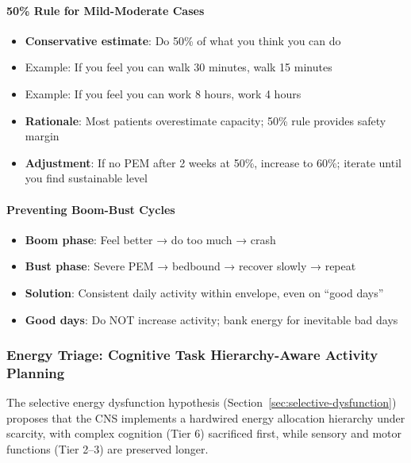 \paragraph{50\% Rule for Mild-Moderate Cases}

\begin{itemize}
    \item \textbf{Conservative estimate}: Do 50\% of what you think you can do
    \item Example: If you feel you can walk 30 minutes, walk 15 minutes
    \item Example: If you feel you can work 8 hours, work 4 hours
    \item \textbf{Rationale}: Most patients overestimate capacity; 50\% rule provides safety margin
    \item \textbf{Adjustment}: If no PEM after 2 weeks at 50\%, increase to 60\%; iterate until you find sustainable level
\end{itemize}

\paragraph{Preventing Boom-Bust Cycles}

\begin{itemize}
    \item \textbf{Boom phase}: Feel better → do too much → crash
    \item \textbf{Bust phase}: Severe PEM → bedbound → recover slowly → repeat
    \item \textbf{Solution}: Consistent daily activity within envelope, even on ``good days''
    \item \textbf{Good days}: Do NOT increase activity; bank energy for inevitable bad days
\end{itemize}

\subsubsection{Energy Triage: Cognitive Task Hierarchy-Aware Activity Planning}
\label{subsubsec:cognitive-hierarchy-allocation}

The selective energy dysfunction hypothesis (Section~\ref{sec:selective-dysfunction}) proposes that the CNS implements a hardwired energy allocation hierarchy under scarcity, with complex cognition (Tier 6) sacrificed first, while sensory and motor functions (Tier 2--3) are preserved longer.

